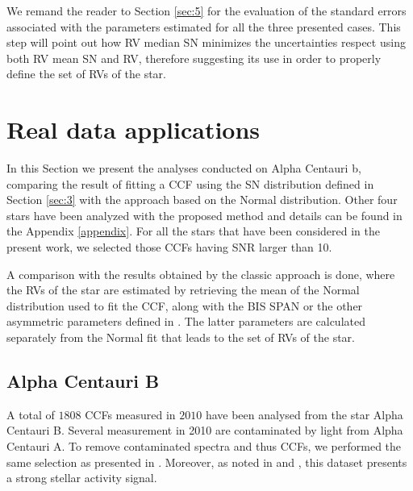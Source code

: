 \documentclass[11pt, oneside]{article}
\begin{document}
{We remand the reader to Section \ref{sec:5} for the evaluation of the standard errors associated with the parameters estimated for all the three presented cases. This step will point out how RV median SN minimizes the uncertainties respect using both RV mean SN and RV, therefore suggesting its use in order to properly define the set of RVs of the star.

\section{Real data applications} \label{sec:4}

In this Section we present the analyses conducted on Alpha Centauri b, comparing the result of fitting a CCF using the SN distribution defined in Section \ref{sec:3} with the approach based on the Normal distribution. Other four stars have been analyzed with the proposed method and details can be found in the Appendix \ref{appendix}. For all the stars that have been considered in the present work, we selected those CCFs having SNR larger than 10.

 A comparison with the results obtained by the classic approach is done, where the RVs of the star are estimated by retrieving the mean of the Normal distribution used to fit the CCF, along with the BIS SPAN or the other asymmetric parameters defined in \citet{Figueira-2013}. The latter parameters are calculated separately from the Normal fit that leads to the set of RVs of the star.

\subsection{Alpha Centauri B} \label{sec:alphacentb}

A total of $1808$ CCFs measured in $2010$ have been analysed from the star Alpha Centauri B. Several measurement in 2010 are contaminated by light from Alpha Centauri A. To remove contaminated spectra and thus CCFs, we performed the same selection as presented in \citet{Dumusque-2012}. Moreover, as noted in \citet{Dumusque-2012} and \citet{Thompson-2017}, this dataset presents a strong stellar activity signal.

}
\end{document}
